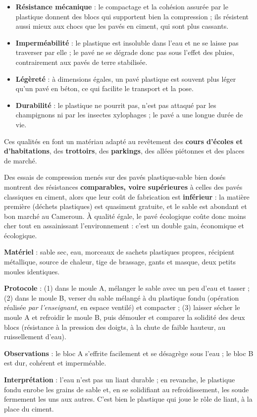 \documentclass[11pt]{article}
\begin{document}
\begin{itemize}
\item \textbf{Résistance mécanique} : le compactage et la cohésion assurée par le plastique donnent des blocs qui supportent bien la compression ; ils résistent aussi mieux aux chocs que les pavés en ciment, qui sont plus cassants.
\item \textbf{Imperméabilité} : le plastique est insoluble dans l'eau et ne se laisse pas traverser par elle ; le pavé ne se dégrade donc pas sous l'effet des pluies, contrairement aux pavés de terre stabilisée.
\item \textbf{Légèreté} : à dimensions égales, un pavé plastique est souvent plus léger qu'un pavé en béton, ce qui facilite le transport et la pose.
\item \textbf{Durabilité} : le plastique ne pourrit pas, n'est pas attaqué par les champignons ni par les insectes xylophages ; le pavé a une longue durée de vie.
\end{itemize}

Ces qualités en font un matériau adapté au revêtement des \textbf{cours d'écoles et d'habitations}, des \textbf{trottoirs}, des \textbf{parkings}, des allées piétonnes et des places de marché.

\begin{exemplebox}
Des essais de compression menés sur des pavés plastique-sable bien dosés montrent des résistances \textbf{comparables, voire supérieures} à celles des pavés classiques en ciment, alors que leur coût de fabrication est \textbf{inférieur} : la matière première (déchets plastiques) est quasiment gratuite, et le sable est abondant et bon marché au Cameroun. À qualité égale, le pavé écologique coûte donc moins cher tout en assainissant l'environnement : c'est un double gain, économique et écologique.
\end{exemplebox}

\begin{experience}
\textbf{Matériel} : sable sec, eau, morceaux de sachets plastiques propres, récipient métallique, source de chaleur, tige de brassage, gants et masque, deux petits moules identiques.\par
\textbf{Protocole} : (1) dans le moule A, mélanger le sable avec un peu d'eau et tasser ; (2) dans le moule B, verser du sable mélangé à du plastique fondu (opération réalisée \emph{par l'enseignant}, en espace ventilé) et compacter ; (3) laisser sécher le moule A et refroidir le moule B, puis démouler et comparer la solidité des deux blocs (résistance à la pression des doigts, à la chute de faible hauteur, au ruissellement d'eau).\par
\textbf{Observations} : le bloc A s'effrite facilement et se désagrège sous l'eau ; le bloc B est dur, cohérent et imperméable.\par
\textbf{Interprétation} : l'eau n'est pas un liant durable ; en revanche, le plastique fondu enrobe les grains de sable et, en se solidifiant au refroidissement, les soude fermement les uns aux autres. C'est bien le plastique qui joue le rôle de liant, à la place du ciment.
\end{experience}
\end{document}
